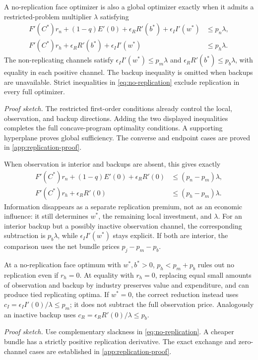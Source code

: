 \begin{proposition}
\label{prop:no-replication}
A no-replication face optimizer is also a global optimizer exactly when
it admits a restricted-problem multiplier $\lambda$ satisfying
\begin{align}
 F'(C^*)r_n+(1-q)E'(0)+\epsilon_RR'(b^*)+\epsilon_II'(w^*)
     &\leq p_n\lambda,\nonumber\\
 F'(C^*)r_h+\epsilon_RR'(b^*)+\epsilon_II'(w^*)
     &\leq p_h\lambda.
 \label{eq:no-replication}
\end{align}
The non-replicating channels satisfy
$\epsilon_II'(w^*)\leq p_m\lambda$ and
$\epsilon_RR'(b^*)\leq p_b\lambda$, with equality in each positive
channel. The backup inequality is omitted when backups are unavailable.
Strict inequalities in \cref{eq:no-replication} exclude replication in
every full optimizer.
\end{proposition}
\noindent\emph{Proof sketch.}
The restricted first-order conditions already control the local,
observation, and backup directions. Adding the two displayed inequalities
completes the full concave-program optimality conditions. A supporting
hyperplane proves global sufficiency. The converse and endpoint cases
are proved in \cref{app:replication-proof}.

When observation is interior and backups are absent, this gives exactly
\begin{align}
 F'(C^*)r_n+(1-q)E'(0)+\epsilon_RR'(0)&\leq(p_n-p_m)\lambda,\nonumber\\
 F'(C^*)r_h+\epsilon_RR'(0)&\leq(p_h-p_m)\lambda.
 \label{eq:observation-net}
\end{align}
Information disappears as a separate replication premium, not as an
economic influence: it still determines $w^*$, the remaining local
investment, and $\lambda$. For an interior backup but a possibly inactive
observation channel, the corresponding subtraction is $p_b\lambda$, while
$\epsilon_II'(w^*)$ stays explicit. If both are interior, the comparison
uses the net bundle prices $p_j-p_m-p_b$.

\begin{corollary}
\label{cor:bundle}
At a no-replication face optimum with $w^*,b^*>0$, $p_h<p_m+p_b$
rules out no replication even if $r_h=0$. At equality with $r_h=0$,
replacing equal small amounts of observation and backup by industry
preserves value and expenditure, and can produce tied replicating optima.
If $w^*=0$, the correct reduction instead uses
$c_I=\epsilon_II'(0)/\lambda\leq p_m$; it does not subtract the full
observation price. Analogously an inactive backup uses
$c_R=\epsilon_RR'(0)/\lambda\leq p_b$.
\end{corollary}
\noindent\emph{Proof sketch.}
Use complementary slackness in \cref{eq:no-replication}. A cheaper bundle
has a strictly positive replication derivative. The exact exchange and
zero-channel cases are established in \cref{app:replication-proof}.

